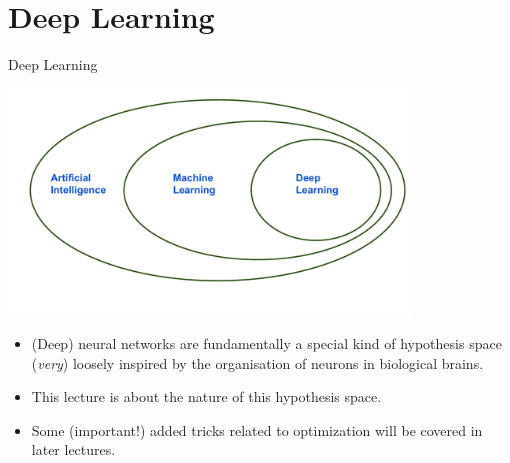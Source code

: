 \section{Deep Learning }


\begin{frame} {Deep Learning}

\vspace*{-0.5cm}

\begin{center}
\includegraphics[width=0.8\textwidth]{plots/learning.pdf}
\end{center}

\vspace*{-1cm}

  \begin{itemize}
    \item (Deep) neural networks are fundamentally a special kind of hypothesis space (\textit{very}) loosely inspired by the organisation of neurons in biological brains.
    \item This lecture is about the nature of this hypothesis space.
    \item Some (important!) added tricks related to optimization will be covered in later lectures.
  \end{itemize}
\end{frame}

\endlecture
